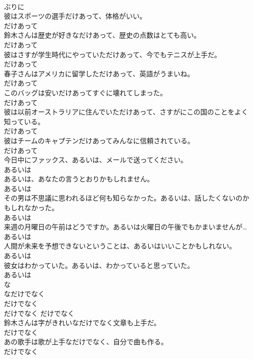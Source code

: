 \documentclass[8pt]{extreport}
\begin{document}
\begin{CJK}{UTF8}{min}
\\	ぶりに
\\	彼はスポーツの選手だけあって、体格がいい。	
\\	だけあって
\\	鈴木さんは歴史が好きなだけあって、歴史の点数はとても高い。	
\\	だけあって
\\	彼はさすが学生時代にやっていただけあって、今でもテニスが上手だ。	
\\	だけあって
\\	春子さんはアメリカに留学しただけあって、英語がうまいね。	
\\	だけあって
\\	このバッグは安いだけあってすぐに壊れてしまった。	
\\	だけあって
\\	彼は以前オーストラリアに住んでいただけあって、さすがにこの国のことをよく知っている。	
\\	だけあって
\\	彼はチームのキャプテンだけあってみんなに信頼されている。	
\\	だけあって
\\	今日中にファックス、あるいは、メールで送ってください。	
\\	あるいは
\\	あるいは、あなたの言うとおりかもしれません。	
\\	あるいは
\\	その男は不思議に思われるほど何も知らなかった。あるいは、話したくないのかもしれなかった。	
\\	あるいは
\\	来週の月曜日の午前はどうですか。あるいは火曜日の午後でもかまいませんが…	
\\	あるいは
\\	人間が未来を予想できないということは、あるいはいいことかもしれない。	
\\	あるいは
\\	彼女はわかっていた。あるいは、わかっていると思っていた。	
\\	あるいは
\\	な
\\	なだけでなく	
\\	だけでなく	
\\	だけでなく	だけでなく
\\	鈴木さんは字がきれいなだけでなく文章も上手だ。	
\\	だけでなく
\\	あの歌手は歌が上手なだけでなく、自分で曲も作る。	
\\	だけでなく

\end{CJK}
\end{document}
